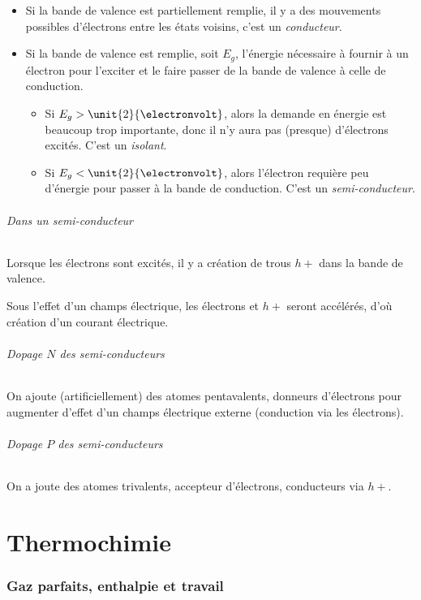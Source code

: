 \documentclass[11pt,a4paper,french]{article}
\begin{document}
\begin{itemize}
	\item Si la bande de valence est partiellement remplie, il y a des mouvements possibles d'électrons entre les états voisins, c'est un {\em conducteur}.
	\item Si la bande de valence est remplie, soit $E_g$, l'énergie nécessaire à fournir à un électron pour l'exciter et le faire passer de la bande de valence à celle de conduction.
		\begin{itemize}
			\item Si $E_g > \unit{2}{\electronvolt}$, alors la demande en énergie est beaucoup trop importante, donc il n'y aura pas (presque) d'électrons excités.
				C'est un {\em isolant}.
			\item Si $E_g < \unit{2}{\electronvolt}$, alors l'électron requière peu d'énergie pour passer à la bande de conduction.
				C'est un {\em semi-conducteur}.
		\end{itemize}
\end{itemize}

\paragraph{Dans un semi-conducteur}
Lorsque les électrons sont excités, il y a création de trous $h+$ dans la bande de valence. %

Sous l'effet d'un champs électrique, les électrons et $h+$ seront accélérés, d'où création d'un courant électrique.

\paragraph{Dopage $N$ des semi-conducteurs}
On ajoute (artificiellement) des atomes pentavalents, donneurs d'électrons pour augmenter d'effet d'un champs électrique externe (conduction via les électrons).

\paragraph{Dopage $P$ des semi-conducteurs}
On a joute des atomes trivalents, accepteur d'électrons, conducteurs via $h+$.


\part{Thermochimie}
\section{Gaz parfaits, enthalpie et travail}
\end{document}
